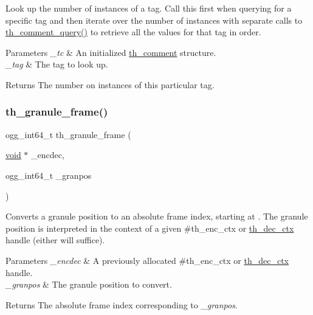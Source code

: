 Look up the number of instances of a tag. Call this first when querying for a specific tag and then iterate over the number of instances with separate calls to \hyperlink{group__basefuncs_ga33c8b4f57a03217636d704c2ebb211fa}{th\+\_\+comment\+\_\+query()} to retrieve all the values for that tag in order. 
\begin{DoxyParams}{Parameters}
{\em \+\_\+tc} & An initialized \hyperlink{structth__comment}{th\+\_\+comment} structure. \\
\hline
{\em \+\_\+tag} & The tag to look up. \\
\hline
\end{DoxyParams}
\begin{DoxyReturn}{Returns}
The number on instances of this particular tag. 
\end{DoxyReturn}
\mbox{\label{group__basefuncs_ga95b10e76fc4c05d0240ea2dfd9fd62bd}} 
\subsubsection{\texorpdfstring{th\+\_\+granule\+\_\+frame()}{th\_granule\_frame()}}
{\footnotesize\ttfamily ogg\+\_\+int64\+\_\+t th\+\_\+granule\+\_\+frame (\begin{DoxyParamCaption}\item[{\hyperlink{png_8h_ac9c84fa68bbad002983e35ce3663c686}{void} $\ast$}]{\+\_\+encdec,  }\item[{ogg\+\_\+int64\+\_\+t}]{\+\_\+granpos }\end{DoxyParamCaption})}

Converts a granule position to an absolute frame index, starting at {}. The granule position is interpreted in the context of a given \#th\+\_\+enc\+\_\+ctx or \hyperlink{theoradec_8h_a843d70bb02563885a8d54b9c1a781729}{th\+\_\+dec\+\_\+ctx} handle (either will suffice). 
\begin{DoxyParams}{Parameters}
{\em \+\_\+encdec} & A previously allocated \#th\+\_\+enc\+\_\+ctx or \hyperlink{theoradec_8h_a843d70bb02563885a8d54b9c1a781729}{th\+\_\+dec\+\_\+ctx} handle. \\
\hline
{\em \+\_\+granpos} & The granule position to convert. \\
\hline
\end{DoxyParams}
\begin{DoxyReturn}{Returns}
The absolute frame index corresponding to {\itshape \+\_\+granpos}. 
\end{DoxyReturn}

